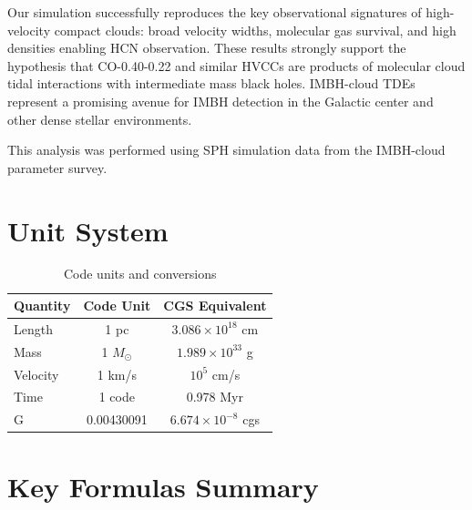 \documentclass[twocolumn,amsmath,amssymb,prd,superscriptaddress,nofootinbib]{revtex4-2}
\begin{document}
Our simulation successfully reproduces the key observational signatures of high-velocity compact clouds: broad velocity widths, molecular gas survival, and high densities enabling HCN observation. These results strongly support the hypothesis that CO-0.40-0.22 and similar HVCCs are products of molecular cloud tidal interactions with intermediate mass black holes. IMBH-cloud TDEs represent a promising avenue for IMBH detection in the Galactic center and other dense stellar environments.

\begin{acknowledgments}
This analysis was performed using SPH simulation data from the IMBH-cloud parameter survey.
\end{acknowledgments}

\appendix

\section{Unit System}
\label{app:units}

\begin{table}[h]
\centering
\caption{Code units and conversions}
\begin{tabular}{lcc}
\toprule
Quantity & Code Unit & CGS Equivalent \\
\midrule
Length & 1 pc & $3.086 \times 10^{18}$ cm \\
Mass & 1 $M_\odot$ & $1.989 \times 10^{33}$ g \\
Velocity & 1 km/s & $10^5$ cm/s \\
Time & 1 code & 0.978 Myr \\
G & 0.00430091 & $6.674 \times 10^{-8}$ cgs \\
\bottomrule
\end{tabular}
\end{table}

\section{Key Formulas Summary}
\label{app:formulas}
\end{document}
